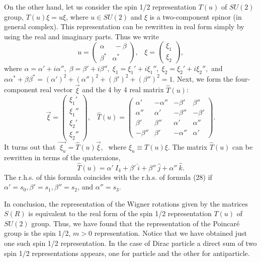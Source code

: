 \documentclass[12pt]{article}
\begin{document}
On the other hand,  let us consider the spin 1/2  representation  $T(u)$ of $SU(2)$ group,  $T(u) \xi = u \xi$,  where $u\in SU(2)$ and $\xi$ is  a two-component spinor (in general complex).  This representation can be rewritten in  real form  simply by using  the real and imaginary parts.  Thus  we write  
\[  u = \left( \begin{array}{cc} \alpha & \ -\beta \\ \beta^* & \alpha^*   \end{array}   \right), \;\;\; \xi = \left( \begin{array}{c} \xi_1 \\   \xi_2 \end{array}  \right), \] 
where $\alpha= \alpha' + i \alpha'',  \; \beta = \beta' + i \beta'', \;  \xi_1= \xi_1' + i \xi_1'', \; \xi_2= \xi_2' + i \xi_2'', $ and 
$ \alpha \alpha^* + \beta \beta^* =(\alpha')^2 +(\alpha'')^2 + (\beta')^2 +(\beta'')^2 =1.$
Next, we form the four-component real vector $\vec{\xi}$ and the 4 by 4 real matrix $\hat{T}(u)$: \[
\vec{\xi} = \left(  \begin{array}{c} \xi_1' \\ \xi_1'' \\ \xi_2' \\ \xi_2''  \end{array}   \right), \;\;\; \hat{T}(u) = \left( \begin{array}{cccc} \alpha' & - \alpha'' & -\beta' &  \beta'' \\  \alpha'' & \alpha' & -\beta'' &  -\beta' \\  \beta' &  \beta'' & \alpha' & \alpha'' \\  -\beta''&  \beta' & -\alpha'' & \alpha' 
\end{array}  \right).  \]
It turns out that $\vec{\;\xi_u} = \hat{T}(u) \vec{\xi}, \;$ where $\xi_u \equiv T(u) \xi$. The matrix $\hat{T}(u)$ can be 
rewritten in terms of the quaternions, 
\begin{equation} \hat{T}(u) = \alpha' \:I_4 + \beta' \: \hat{i}+  \beta'' \: \hat{j}+  \alpha'' \:\hat{k}. \end{equation}
The r.h.s. of this formula  coincides with the r.h.s. of formula (28) if $  \alpha' = s_0,  \beta'  =s_1,   \beta'' = s_2$, and $ \alpha'' = s_3.   $  

In conclusion,   the representation of the Wigner rotations  given by the matrices $S(R)$  is equivalent to the real form of the spin 1/2 representation $T(u)$ of  $SU(2)$ group.  Thus, we have found that the representation of the Poincar\'e group  is the spin 1/2, $m>0$ representation. 
 Notice  that we have obtained  just one such spin 1/2 representation. In the  case of  Dirac particle a direct sum of two spin 1/2 representations  appears, one for particle and the other for antiparticle.  
\end{document}
